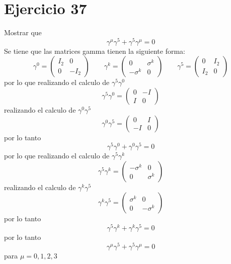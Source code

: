 \section*{Ejercicio 37}
Mostrar que
\begin{equation*}
    \gamma^\mu \gamma^5 + \gamma^5 \gamma^\mu  =0
\end{equation*}
Se tiene que las matrices gamma tienen la siguiente forma: 
\begin{equation*}
    \gamma^0 = \left(\begin{matrix}
        I_2 & 0\\ 0 & -I_2  
    \end{matrix}\right) \qquad
    \gamma^k = \left(\begin{matrix}
         0 & \sigma^k \\  -\sigma^k  & 0
    \end{matrix}\right) \qquad
    \gamma^5 = \left(\begin{matrix}
         0 & I_2\\ I_2  & 0
    \end{matrix}\right)
\end{equation*}
por lo que realizando el calculo de $\gamma^5 \gamma^0$ 
\begin{equation*}
    \gamma^5 \gamma^0 =\left(\begin{matrix}
        0 & -I \\ I & 0
    \end{matrix}\right)
\end{equation*}
realizando el calculo de $\gamma^0 \gamma^5$  
\begin{equation*}
    \gamma^0 \gamma^5 =\left(\begin{matrix}
        0 & I \\ -I & 0
    \end{matrix}\right)
\end{equation*}
por lo tanto
\begin{equation*}
    \gamma^5 \gamma^0 + \gamma^0 \gamma^5 = 0
\end{equation*}
por lo que realizando el calculo de $\gamma^5 \gamma^k$ 
\begin{equation*}
    \gamma^5 \gamma^k =\left(\begin{matrix}
        -\sigma^k & 0 \\ 0 & \sigma^k
    \end{matrix}\right)
\end{equation*}
realizando el calculo de $\gamma^k \gamma^5$  
\begin{equation*}
    \gamma^k \gamma^5 =\left(\begin{matrix}
        \sigma^k & 0 \\ 0 & -\sigma^k
    \end{matrix}\right)
\end{equation*}
por lo tanto
\begin{equation*}
    \gamma^5 \gamma^k + \gamma^k \gamma^5 = 0
\end{equation*}
por lo tanto 
\begin{equation*}
    \gamma^\mu \gamma^5 + \gamma^5 \gamma^\mu  =0
\end{equation*}
para $\mu=0,1,2,3$